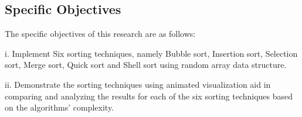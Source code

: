 \documentclass{article}
\begin{document}
\subsection*{Specific Objectives}
	The specific objectives of this research are as follows:
		\begin{list}{}
			\item i. Implement Six sorting techniques, namely Bubble sort, Insertion sort, Selection sort, Merge sort, Quick sort and Shell sort using random array data structure.
			\item ii. Demonstrate the sorting techniques using animated visualization aid in comparing and analyzing the results for each of the six sorting techniques based on the algorithms’ complexity.
		\end{list}
		
\end{document}
